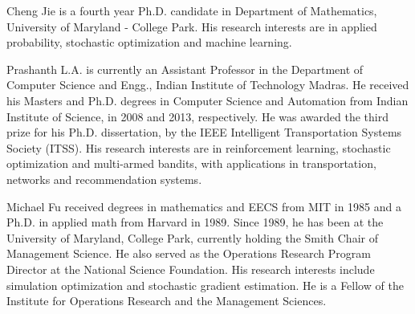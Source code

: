 \documentclass[twocolumn]{IEEEtran}
\begin{document}



\vspace{-1ex}


\begin{IEEEbiographynophoto}{Cheng Jie}
is a fourth year Ph.D. candidate in Department of Mathematics, University of Maryland - College Park. His research interests are in applied probability, stochastic optimization and machine learning. 
\end{IEEEbiographynophoto}

\vspace{-3ex}

\begin{IEEEbiographynophoto}{Prashanth L.A.}
is currently an Assistant Professor in the Department of Computer Science and Engg., Indian Institute of Technology Madras.
He received his Masters and Ph.D. degrees in Computer Science and Automation from Indian Institute of Science, in 2008 and 2013, respectively.  He was awarded the third prize for his Ph.D. dissertation, by the IEEE Intelligent Transportation Systems Society (ITSS).
His research interests are in reinforcement learning, stochastic optimization and multi-armed bandits, with applications in transportation, networks and recommendation systems.
\end{IEEEbiographynophoto}

\vspace{-3ex}

\begin{IEEEbiographynophoto}{Michael Fu}
received degrees in mathematics and EECS from MIT in 1985 and a Ph.D. in applied math from Harvard in 1989. Since 1989, he has been at the University of Maryland, College Park, currently holding the Smith Chair of Management Science.  He also served as the Operations Research Program Director at the National Science Foundation. His research interests include simulation optimization and stochastic gradient estimation. He is a Fellow of the Institute for Operations Research and the Management Sciences.
\end{IEEEbiographynophoto}
\end{document}
